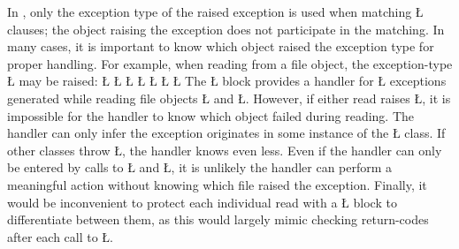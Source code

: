 \documentclass[openright,twoside]{report}
\begin{document}
In \CC, only the exception type of the raised exception is used when matching \LGinlinetrue\LGbegin\lgrinde\L{}\endlgrinde\LGend{} clauses;
the object raising the exception does not participate in the matching.
In many cases, it is important to know which object raised the exception type for proper handling.
For example, when reading from a file object, the exception-type \LGinlinetrue\LGbegin\lgrinde\L{}\endlgrinde\LGend{} may be raised:
\LGinlinefalse\LGbegin\lgrinde
\L{}
\L{}
\L{\LB{}}
\L{\LB{}}
\L{}
\L{\LB{}}
\CE{}\L{\LB{\}}}
\endlgrinde\LGend
The \LGinlinetrue\LGbegin\lgrinde\L{}\endlgrinde\LGend{} block provides a handler for \LGinlinetrue\LGbegin\lgrinde\L{}\endlgrinde\LGend{} exceptions generated while reading file objects \LGinlinetrue\LGbegin\lgrinde\L{}\endlgrinde\LGend{} and \LGinlinetrue\LGbegin\lgrinde\L{}\endlgrinde\LGend{}.
However, if either read raises \LGinlinetrue\LGbegin\lgrinde\L{}\endlgrinde\LGend{}, it is impossible for the handler to know which object failed during reading.
The handler can only infer the exception originates in some instance of the \LGinlinetrue\LGbegin\lgrinde\L{}\endlgrinde\LGend{} class.
If other classes throw \LGinlinetrue\LGbegin\lgrinde\L{}\endlgrinde\LGend{}, the handler knows even less.
Even if the handler can only be entered by calls to \LGinlinetrue\LGbegin\lgrinde\L{}\endlgrinde\LGend{} and \LGinlinetrue\LGbegin\lgrinde\L{}\endlgrinde\LGend{}, it is unlikely the handler can perform a meaningful action without knowing which file raised the exception.
Finally, it would be inconvenient to protect each individual read with a \LGinlinetrue\LGbegin\lgrinde\L{}\endlgrinde\LGend{} block to differentiate between them, as this would largely mimic checking return-codes after each call to \LGinlinetrue\LGbegin\lgrinde\L{}\endlgrinde\LGend{}.
\end{document}
